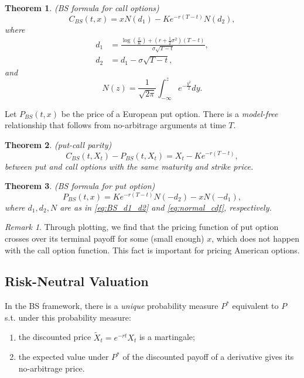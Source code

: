 \documentclass[a4paper,12pt]{article}
\numberwithin{equation}{section}
\newtheorem{theorem}{Theorem}[section]
\theoremstyle{definition}
\theoremstyle{remark}
\newtheorem{remark}{Remark}[section]
\begin{document}
\begin{theorem}
(BS formula for call options)
\begin{equation}
\label{eq:BS_call}
    C_{BS}(t,x)=xN(d_{1})-Ke^{-r(T-t)}N(d_{2}),
\end{equation}
where 
\begin{equation}
    \label{eq:BS_d1_d2}
    \begin{split}
    d_{1}&=\frac{\log(\frac{x}{K})+
    (r+\frac{1}{2}\sigma^{2})(T-t)}{\sigma\sqrt{T-t}}, \\
    d_{2}&=d_{1}-\sigma\sqrt{T-t},
    \end{split}
\end{equation}
and 
\begin{equation}
\label{eq:normal_cdf}
    N(z)=\frac{1}{\sqrt{2\pi}}\int_{-\infty}^{z} e^{-\frac{y^{2}}{2}} dy.
\end{equation}
\end{theorem}

Let $P_{BS}(t,x)$ be the price of a European put option. There is 
a \textit{model-free} relationship that follows from no-arbitrage 
arguments at time $T$.

\begin{theorem}
(put-call parity)
\begin{equation}
\label{eq:call_put_parity}
    C_{BS}(t,X_t)-P_{BS}(t,X_t)=X_{t}-Ke^{-r(T-t)},
\end{equation}
between put and call options with the same maturity and strike 
price.
\end{theorem}

\begin{theorem}
(BS formula for put option)
\begin{equation}
\label{eq:BS_put}
    P_{BS}(t,x)=Ke^{-r(T-t)}N(-d_{2})-xN(-d_{1}),
\end{equation}
where $d_{1},d_{2},N$ are as in \eqref{eq:BS_d1_d2} and 
\eqref{eq:normal_cdf}, respectively.
\end{theorem}    

\begin{remark}
Through plotting, we find that the pricing function of put option 
crosses over its terminal payoff for some (small enough) $x$, 
which does not happen with the call option function. This fact is 
important for pricing American options.
\end{remark}

\subsection{Risk-Neutral Valuation}\label{sec:risk_neutral_BS}
In the BS framework, there is a \textit{unique} probability measure 
$P^{*}$ equivalent to $P$ s.t. under this probability measure:
\begin{enumerate}
    \item the discounted price $\widetilde{X}_{t}=e^{-rt}X_{t}$ is a martingale;
    \item the expected value under $P^{*}$ of the discounted 
    payoff of a derivative gives its no-arbitrage price.
\end{enumerate}
\end{document}
